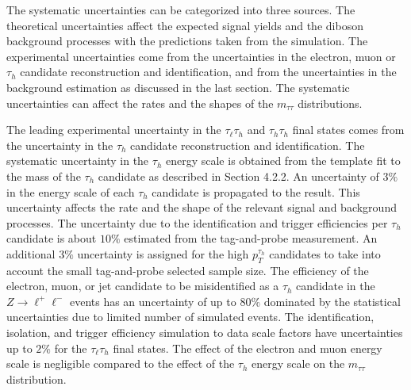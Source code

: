 The systematic uncertainties can be categorized into three sources. The theoretical uncertainties affect the expected signal yields and the diboson background processes with the predictions taken from the simulation. The experimental uncertainties come from the uncertainties in the electron, muon or $\tau_h$ candidate reconstruction and identification, and from the uncertainties in the background estimation as discussed in the last section. The systematic uncertainties can affect the rates and the shapes of the $m_{\tau\tau}$ distributions. 

The leading experimental uncertainty in the $\tau_{\ell}\tau_h$ and $\tau_h\tau_h$ final states comes from the uncertainty in the $\tau_h$ candidate reconstruction and identification. The systematic uncertainty in the $\tau_h$ energy scale is obtained from the template fit to the mass of the $\tau_h$ candidate as described in Section 4.2.2. An uncertainty of $3\%$ in the energy scale of each $\tau_h$ candidate is propagated to the result. This uncertainty affects the rate and the shape of the relevant signal and background processes. The uncertainty due to the identification and trigger efficiencies per $\tau_h$ candidate is about $10\%$ estimated from the tag-and-probe measurement. An additional $3\%$ uncertainty is assigned for the high $p_{T}^{\tau_h}$ candidates to take into account the small tag-and-probe selected sample size. The efficiency of the electron, muon, or jet candidate to be misidentified as a $\tau_h$ candidate in the $Z\rightarrow\ell^{+}\ell^{-}$ events has an uncertainty of up to $80\%$ dominated by the statistical uncertainties due to limited number of simulated events. The identification, isolation, and trigger efficiency simulation to data scale factors have uncertainties up to $2\%$ for the $\tau_{\ell}\tau_h$ final states. The effect of the electron and muon energy scale is negligible compared to the effect of the $\tau_h$ energy scale on the $m_{\tau\tau}$ distribution. 
